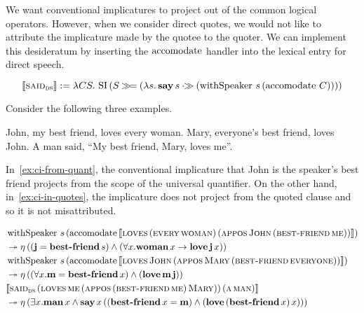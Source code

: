 \documentclass{llncs}
\begin{document}
We want conventional implicatures to project out of the common logical
operators. However, when we consider direct quotes, we would not like to
attribute the implicature made by the quotee to the quoter. We can
implement this desideratum by inserting the $\operatorname{accomodate}$ handler into the
lexical entry for direct speech.

$$
  \llbracket \textsc{said}_{\textsc{ds}} \rrbracket := \lambda C S.\, \operatorname{SI}\,(S \mathbin{\gg\!=} (\lambda s.\, \textbf{say}\,s \mathbin{\cdot\!\!\gg} (\operatorname{withSpeaker}\,s\,(\operatorname{accomodate}\,C))))
$$

Consider the following three examples.

\begin{exe}
  \ex John, my best friend, loves every woman. \label{ex:ci-from-quant}
  \ex Mary, everyone's best friend, loves John. \label{ex:ci-with-quant}
  \ex A man said, ``My best friend, Mary, loves me''. \label{ex:ci-in-quotes}
\end{exe}

In~\eqref{ex:ci-from-quant}, the
conventional implicature that John is the speaker's best friend projects
from the scope of the universal quantifier. On the other hand,
in~\eqref{ex:ci-in-quotes}, the implicature does not project from the
quoted clause and so it is not misattributed.

\begin{align}
  & \operatorname{withSpeaker}\,s\,(\operatorname{accomodate}\,\llbracket \textsc{loves}\,(\textsc{every}\,\textsc{woman})\,(\textsc{appos}\,\textsc{John}\,(\textsc{best-friend}\,\textsc{me})) \rrbracket) \nonumber \\
  & \twoheadrightarrow \eta\,((\textbf{j} = \textbf{best-friend}\,s) \land (\forall x. \textbf{woman}\,x \to \textbf{love}\,\textbf{j}\,x)) \\
  & \operatorname{withSpeaker}\,s\,(\operatorname{accomodate}\,\llbracket \textsc{loves}\,\textsc{John}\,(\textsc{appos}\,\textsc{Mary}\,(\textsc{best-friend}\,\textsc{everyone})) \rrbracket) \nonumber \\
  & \twoheadrightarrow \eta\,((\forall x. \textbf{m} = \textbf{best-friend}\,x) \land (\textbf{love}\,\textbf{m}\,\textbf{j})) \\
  & \llbracket \textsc{said}_{\textsc{ds}}\,(\textsc{loves}\,\textsc{me}\,(\textsc{appos}\,(\textsc{best-friend}\,\textsc{me})\,\textsc{Mary}))\,(\textsc{a}\,\textsc{man}) \rrbracket \nonumber \\
  & \twoheadrightarrow \eta\,(\exists x. \textbf{man}\,x \land \textbf{say}\,x\,((\textbf{best-friend}\,x = \textbf{m}) \land (\textbf{love}\,(\textbf{best-friend}\,x)\,x)))
\end{align}
\end{document}
